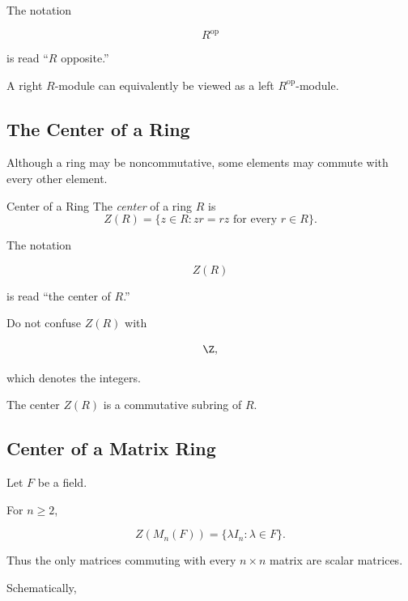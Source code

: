 The notation

\[ R^{\mathrm{op}} \]

is read ``\(R\) opposite.''

A right \(R\)-module can equivalently be viewed as a left
\(R^{\mathrm{op}}\)-module.

\subsection{The Center of a Ring}
\label{subsec:center-of-ring}

Although a ring may be noncommutative, some elements may commute with every
other element.

\begin{definitionbox}{Center of a Ring}
The \emph{center} of a ring \(R\) is
\[ Z(R)=\{z\in R:zr=rz\text{ for every }r\in R\}. \]
\end{definitionbox}

The notation

\[ Z(R) \]

is read ``the center of \(R\).''

Do not confuse \(Z(R)\) with

\[ \Z, \]

which denotes the integers.

The center \(Z(R)\) is a commutative subring of \(R\).

\subsection{Center of a Matrix Ring}
\label{subsec:center-matrix-ring}

Let \(F\) be a field.

For \(n\geq2\),

\[ Z(M_n(F))=\{\lambda I_n:\lambda\in F\}. \]

Thus the only matrices commuting with every \(n\times n\) matrix are scalar
matrices.

Schematically,

\begin{center}
\end{center}

